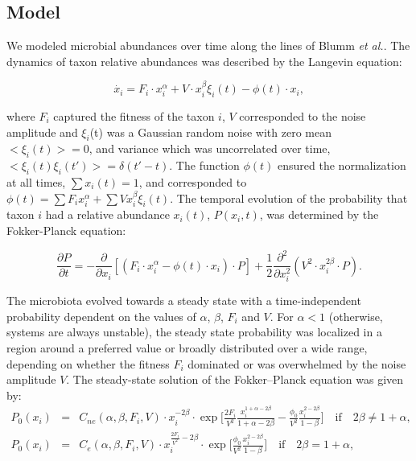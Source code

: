 \subsection*{Model} \label{sec:model}

We modeled microbial abundances over time along the lines of Blumm \textit{et al.}\cite{ranking}. The dynamics of taxon relative abundances was described by the Langevin equation:
\begin{linenomath}
\begin{equation*}
\dot{x_i} = F_i \cdot x_i^\alpha + V \cdot x_i^\beta \xi_i(t) - \phi(t) \cdot x_i,
\end{equation*}
\end{linenomath}
where $F_i$ captured the fitness of the taxon $i$, $V$ corresponded to the noise amplitude and $\xi_i$(t) was a Gaussian random noise with zero mean  $<\xi_i(t)> = 0$, and variance which was uncorrelated over time, $<\xi_i(t) \xi_i(t')> = \delta(t'-t)$. The function $\phi(t)$ ensured the normalization at all times, $\sum x_i(t) = 1$, and corresponded to $\phi(t) = \sum F_i x_i^\alpha + \sum V x_i^\beta \xi_i(t)$.
The temporal evolution of the probability that taxon $i$ had a relative abundance $x_i(t)$, $P(x_i,t)$, was determined by the Fokker-Planck equation:
\begin{linenomath}
\begin{equation*}
\frac{\partial P}{\partial t} = - \frac{\partial}{\partial x_i}  [(F_i \cdot x_i^\alpha - \phi(t) \cdot x_i ) \cdot P]+ \frac{1}{2} \frac{\partial^2}{\partial x_i^2} (V^2 \cdot x_i^{2\beta}\cdot P).
\end{equation*}
\end{linenomath}
The microbiota evolved towards a steady state with a time-independent probability dependent on the values of $\alpha$, $\beta$, $F_i$ and $V$. For $\alpha<1$ (otherwise, systems are always unstable), the steady state probability was localized in a region around a preferred value or broadly distributed over a wide range, depending on whether the fitness $F_i$ dominated or was overwhelmed by the noise amplitude $V$. The steady-state solution of the Fokker--Planck equation was given by:
\begin{eqnarray*}
P_0 (x_i) &=& C_{ne}(\alpha,\beta,F_i,V)  \cdot x_i^{-2\beta}  \cdot \exp\Big[\frac{2F_i}{V^2}\frac{x_i^{1+\alpha-2\beta}}{1+\alpha-2\beta}-\frac{\phi_0}{V^2}\frac{x_i^{2-2\beta}}{1-\beta}\Big] \quad \textrm{if} \quad  2\beta \ne 1+\alpha, \\
P_0 (x_i) &=& C_e(\alpha,\beta,F_i,V)  \cdot x_i^{\frac{2F_i}{V^2} -2\beta}  \cdot \exp\Big[\frac{\phi_0}{V^2}\frac{x_i^{2-2\beta}}{1-\beta}\Big] \quad \textrm{if} \quad  2\beta = 1+\alpha,
\end{eqnarray*}
